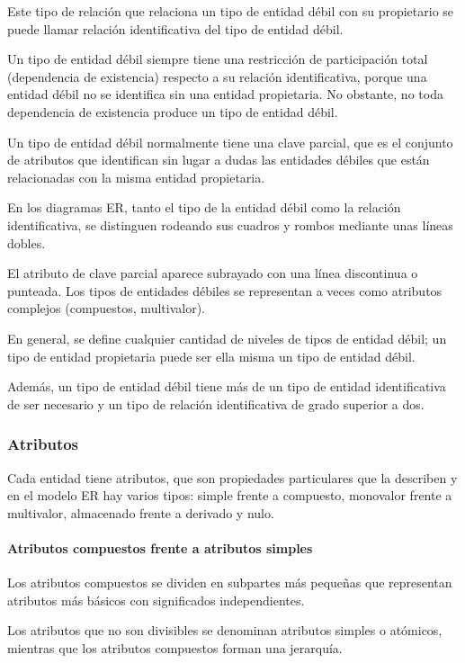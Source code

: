 Este tipo de relación que relaciona un tipo de entidad débil con su propietario se puede llamar relación identificativa del tipo de entidad débil. 


Un tipo de entidad débil siempre tiene una restricción de participación total (dependencia de existencia) respecto a su relación identificativa, porque una entidad débil no se identifica sin una entidad propietaria. No obstante, no toda dependencia de existencia produce un tipo de entidad débil.


Un tipo de entidad débil normalmente tiene una clave parcial, que es el conjunto de atributos que identifican sin lugar a dudas las entidades débiles que están relacionadas con la misma entidad propietaria. 


En los diagramas ER, tanto el tipo de la entidad débil como la relación identificativa, se distinguen rodeando sus cuadros y rombos mediante unas líneas dobles.


El atributo de clave parcial aparece subrayado con una línea discontinua o punteada. Los tipos de entidades débiles se representan a veces como atributos complejos (compuestos, multivalor). 


En general, se define cualquier cantidad de niveles de tipos de entidad débil; un tipo de entidad propietaria puede ser ella misma un tipo de entidad débil. 


Además, un tipo de entidad débil tiene más de un tipo de entidad identificativa de ser necesario y un tipo de relación identificativa de grado superior a dos.

\subsubsection{Atributos}
Cada entidad tiene atributos, que son propiedades particulares que la describen y en el modelo ER hay varios tipos: simple frente a compuesto, monovalor frente a multivalor, almacenado frente a derivado y nulo.


\paragraph*{Atributos compuestos frente a atributos simples} Los atributos compuestos se dividen en subpartes más pequeñas que representan atributos más básicos con significados independientes.


Los atributos que no son divisibles se denominan atributos simples o atómicos, mientras que los atributos compuestos forman una jerarquía. 


